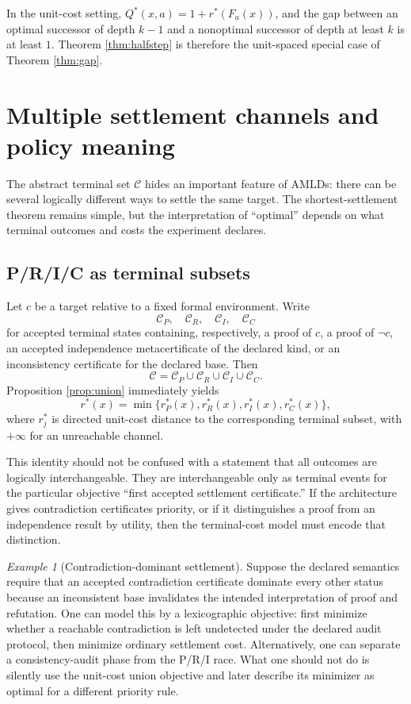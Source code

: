 \documentclass[11pt,letterpaper]{article}
\theoremstyle{remark}
\newtheorem{example}[theorem]{Example}
\newcommand{\Cset}{\mathcal C}
\newcommand{\rstar}{r^{\!*}}
\newcommand{\Qstar}{Q^{\!*}}
\begin{document}
In the unit-cost setting, $\Qstar(x,a)=1+\rstar(F_a(x))$, and the gap between an optimal successor of depth $k-1$ and a nonoptimal successor of depth at least $k$ is at least $1$. Theorem \ref{thm:halfstep} is therefore the unit-spaced special case of Theorem \ref{thm:gap}.

\section{Multiple settlement channels and policy meaning}\label{sec:channels}

The abstract terminal set $\Cset$ hides an important feature of AMLDs: there can be several logically different ways to settle the same target. The shortest-settlement theorem remains simple, but the interpretation of ``optimal'' depends on what terminal outcomes and costs the experiment declares.

\subsection{P/R/I/C as terminal subsets}

Let $c$ be a target relative to a fixed formal environment. Write
\[
\Cset_P,\quad \Cset_R,\quad \Cset_I,\quad \Cset_C
\]
for accepted terminal states containing, respectively, a proof of $c$, a proof of $\neg c$, an accepted independence metacertificate of the declared kind, or an inconsistency certificate for the declared base. Then
\[
\Cset=\Cset_P\cup\Cset_R\cup\Cset_I\cup\Cset_C.
\]
Proposition \ref{prop:union} immediately yields
\[
\rstar(x)=\min\{r_P^*(x),r_R^*(x),r_I^*(x),r_C^*(x)\},
\]
where $r_j^*$ is directed unit-cost distance to the corresponding terminal subset, with $+\infty$ for an unreachable channel.

This identity should not be confused with a statement that all outcomes are logically interchangeable. They are interchangeable only as terminal events for the particular objective ``first accepted settlement certificate.'' If the architecture gives contradiction certificates priority, or if it distinguishes a proof from an independence result by utility, then the terminal-cost model must encode that distinction.

\begin{example}[Contradiction-dominant settlement]
Suppose the declared semantics require that an accepted contradiction certificate dominate every other status because an inconsistent base invalidates the intended interpretation of proof and refutation. One can model this by a lexicographic objective: first minimize whether a reachable contradiction is left undetected under the declared audit protocol, then minimize ordinary settlement cost. Alternatively, one can separate a consistency-audit phase from the P/R/I race. What one should not do is silently use the unit-cost union objective and later describe its minimizer as optimal for a different priority rule.
\end{example}
\end{document}
